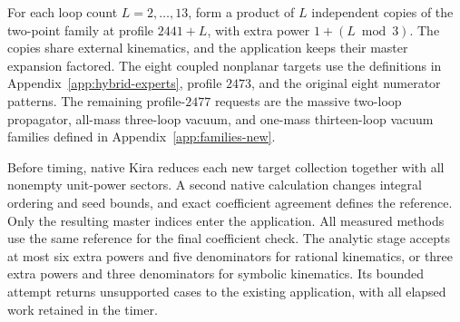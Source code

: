 For each loop count $L=2,\ldots,13$, form a product of $L$ independent copies of the two-point family at profile $2441+L$, with extra power $1+(L\bmod3)$. The copies share external kinematics, and the application keeps their master expansion factored. The eight coupled nonplanar targets use the definitions in Appendix~\ref{app:hybrid-experts}, profile $2473$, and the original eight numerator patterns. The remaining profile-$2477$ requests are the massive two-loop propagator, all-mass three-loop vacuum, and one-mass thirteen-loop vacuum families defined in Appendix~\ref{app:families-new}.

Before timing, native Kira reduces each new target collection together with all nonempty unit-power sectors. A second native calculation changes integral ordering and seed bounds, and exact coefficient agreement defines the reference. Only the resulting master indices enter the application. All measured methods use the same reference for the final coefficient check. The analytic stage accepts at most six extra powers and five denominators for rational kinematics, or three extra powers and three denominators for symbolic kinematics. Its bounded attempt returns unsupported cases to the existing application, with all elapsed work retained in the timer.
